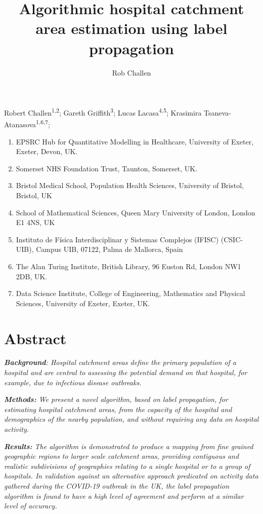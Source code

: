 \documentclass[
]{article}
\title{Algorithmic hospital catchment area estimation using label propagation}
\author{Rob Challen}
\date{}
\providecommand{\tightlist}{%
  \setlength{\itemsep}{0pt}\setlength{\parskip}{0pt}}
\begin{document}
\maketitle

Robert Challen\textsuperscript{1,2}; Gareth Griffith\textsuperscript{3};
Lucas Lacasa\textsuperscript{4,5}; Krasimira
Tsaneva-Atanasova\textsuperscript{1,6,7};

\begin{enumerate}
\def\labelenumi{\arabic{enumi})}
\tightlist
\item
  EPSRC Hub for Quantitative Modelling in Healthcare, University of
  Exeter, Exeter, Devon, UK.
\item
  Somerset NHS Foundation Trust, Taunton, Somerset, UK.
\item
  Bristol Medical School, Population Health Sciences, University of
  Bristol, Bristol, UK
\item
  School of Mathematical Sciences, Queen Mary University of London,
  London E1 4NS, UK
\item
  Instituto de Física Interdisciplinar y Sistemas Complejos (IFISC)
  (CSIC-UIB), Campus UIB, 07122, Palma de Mallorca, Spain
\item
  The Alan Turing Institute, British Library, 96 Euston Rd, London NW1
  2DB, UK.
\item
  Data Science Institute, College of Engineering, Mathematics and
  Physical Sciences, University of Exeter, Exeter, UK.
\end{enumerate}

\hypertarget{abstract}{%
\section{Abstract}\label{abstract}}

\emph{\textbf{Background}: Hospital catchment areas define the primary
population of a hospital and are central to assessing the potential
demand on that hospital, for example, due to infectious disease
outbreaks.}

\emph{\textbf{Methods:} We present a novel algorithm, based on label
propagation, for estimating hospital catchment areas, from the capacity
of the hospital and demographics of the nearby population, and without
requiring any data on hospital activity.}

\emph{\textbf{Results:} The algorithm is demonstrated to produce a
mapping from fine grained geographic regions to larger scale catchment
areas, providing contiguous and realistic subdivisions of geographies
relating to a single hospital or to a group of hospitals. In validation
against an alternative approach predicated on activity data gathered
during the COVID-19 outbreak in the UK, the label propagation algorithm
is found to have a high level of agreement and perform at a similar
level of accuracy.}
\end{document}
